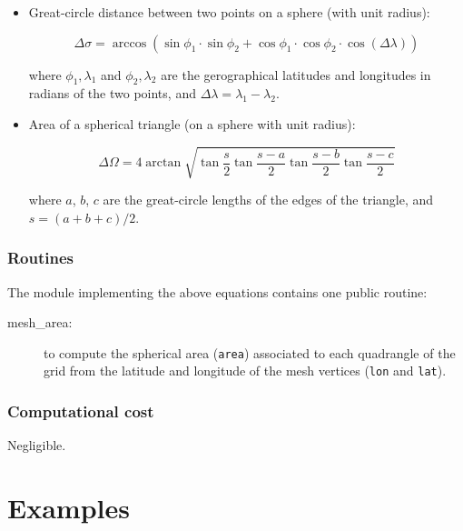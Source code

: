 \documentclass[11pt]{article}
\begin{document}
\begin{itemize}
\item Great-circle distance between two points on a sphere (with unit radius):

\begin{equation}
\Delta \sigma = \arccos \left(
    \sin\phi_1 \cdot \sin\phi_2 + \cos\phi_1 \cdot \cos\phi_2 \cdot \cos(\Delta\lambda)
                        \right)
\end{equation}

\noindent
where $\phi_1,\lambda_1$ and $\phi_2,\lambda_2$ are the gerographical
latitudes and longitudes in radians of the two points,
and $\Delta\lambda=\lambda_1-\lambda_2$.

\item Area of a spherical triangle (on a sphere with unit radius):

\begin{equation}
\Delta\Omega =
  4 \arctan
  \sqrt{
    \tan \frac{s}{2} \tan \frac{s-a}{2} \tan \frac{s-b}{2} \tan \frac{s-c}{2}
  }
\end{equation}

\noindent
where $a$, $b$, $c$ are the great-circle lengths of the edges of the triangle, and $s=(a+b+c)/2$.

\end{itemize}

\subsubsection*{Routines}

The module implementing the above equations
contains one public routine:
\begin{description}
\item[mesh\_area:] to compute the spherical area ({\tt area})
associated to each quadrangle of the grid
from the latitude and longitude of the mesh vertices ({\tt lon} and {\tt lat}).
\end{description}

\subsubsection*{Computational cost}

Negligible.

\clearpage

\section{Examples}
\end{document}
